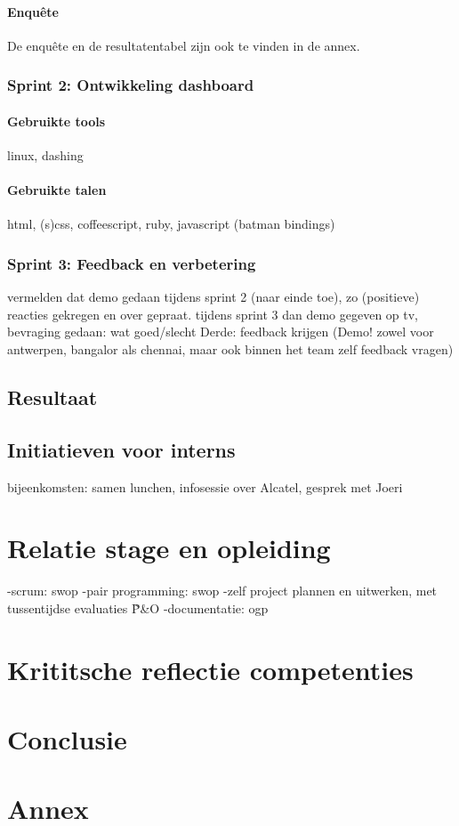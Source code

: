 \documentclass[10pt,a4paper]{article}
\begin{document}
\paragraph{Enqu\^ete} 
De enqu\^ete en de resultatentabel zijn ook te vinden in de annex. 
\subsubsection{Sprint 2: Ontwikkeling dashboard} 
\label{sprint2}
\paragraph{Gebruikte tools}
 linux, dashing
\paragraph{Gebruikte talen}
html, (s)css, coffeescript, ruby, javascript (batman bindings)
\subsubsection{Sprint 3: Feedback en verbetering}
\label{sprint3}
vermelden dat demo gedaan tijdens sprint 2 (naar einde toe), zo (positieve) reacties gekregen en over gepraat. tijdens sprint 3 dan demo gegeven op tv, bevraging gedaan: wat goed/slecht
Derde: feedback krijgen (Demo! zowel voor antwerpen, bangalor als chennai, maar ook binnen het team zelf feedback vragen)
\subsection{Resultaat}
\subsection{Initiatieven voor interns}
bijeenkomsten: samen lunchen, infosessie over Alcatel, gesprek met Joeri
\section{Relatie stage en opleiding}
-scrum: swop
-pair programming: swop
-zelf project plannen en uitwerken, met tussentijdse evaluaties \~ P\&O
-documentatie: ogp
\section{Krititsche reflectie competenties}

\section{Conclusie}

\section{Annex}
\end{document}

